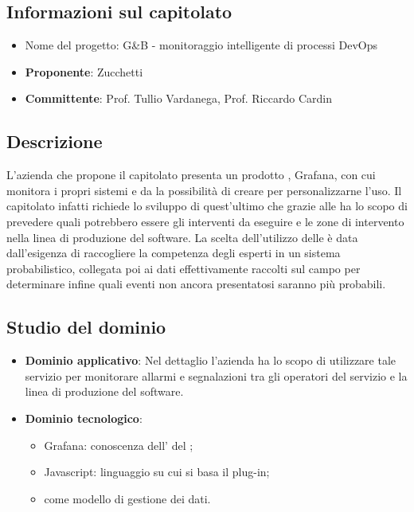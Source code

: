 \subsection{Informazioni sul capitolato}
    \begin{itemize}
        \item Nome del progetto: G\&B - monitoraggio intelligente di processi DevOps
        \item \textbf{Proponente}: Zucchetti
        \item \textbf{Committente}: Prof. Tullio Vardanega, Prof. Riccardo Cardin
    \end{itemize}
\subsection{Descrizione}
L'azienda che propone il capitolato presenta un prodotto , Grafana, con cui monitora i propri sistemi e da la possibilità di creare  per personalizzarne l'uso. Il capitolato infatti richiede lo sviluppo di quest'ultimo che grazie alle  ha lo scopo di prevedere quali potrebbero essere gli interventi da eseguire e le zone di intervento nella linea di produzione del software. La scelta dell'utilizzo delle  è data dall'esigenza di raccogliere la competenza degli esperti in un sistema probabilistico, collegata poi ai dati effettivamente raccolti sul campo per determinare infine quali eventi non ancora presentatosi saranno più probabili. 

\subsection{Studio del dominio}
     \begin{itemize}
        \item \textbf{Dominio applicativo}: Nel dettaglio l'azienda ha lo scopo di utilizzare tale servizio per monitorare allarmi e segnalazioni tra gli operatori del servizio  e la linea di produzione del software.
        \item \textbf{Dominio tecnologico}:
            \begin{itemize}
                \item Grafana: conoscenza dell' del ;
                \item Javascript: linguaggio su cui si basa il plug-in;
                \item {} come modello di gestione dei dati.
            \end{itemize}
    \end{itemize}
